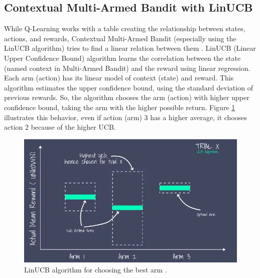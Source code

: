 \subsection{Contextual Multi-Armed Bandit with LinUCB}

While Q-Learning works with a table creating the relationship between states, actions, and rewards, Contextual Multi-Armed Bandit (especially using the LinUCB algorithm) tries to find a linear relation between them \cite{li2010contextual}. LinUCB (Linear Upper Confidence Bound) algorithm learns the correlation between the state (named context in Multi-Armed Bandit) and the reward using linear regression. Each arm (action) has its linear model of context (state) and reward. This algorithm estimates the upper confidence bound, using the standard deviation of previous rewards. So, the algorithm chooses the arm (action) with higher upper confidence bound, taking the arm with the higher possible return. Figure \ref{fig:linucb} illustrates this behavior, even if action (arm) 3 has a higher average, it chooses action 2 because of the higher UCB.

\begin{figure}[!htb]
    \centering
    \includegraphics[scale=0.58]{Images/Learning_compensations/linucb.jpg}
    \caption[LinUCB algorithm for choosing the best arm.]{LinUCB algorithm for choosing the best arm \cite{recommender2020}.}
    \label{fig:linucb}
\end{figure}

